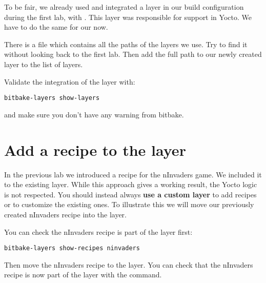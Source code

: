 To be fair, we already used and integrated a layer in our build configuration
during the first lab, with 
{} {}. This layer was responsible for  {}
{ {} {}} support in Yocto. We have to do the same for our
 now.

There is a file which contains all the paths of the layers we use. Try to find it
without looking back to the first lab. Then add the full path to our newly
created layer to the list of layers.

Validate the integration of the  layer with:
\begin{verbatim}
bitbake-layers show-layers
\end{verbatim}

and make sure you don't have any warning from bitbake.

\section{Add a recipe to the layer}

In the previous lab we introduced a recipe for the nInvaders game. We included
it to the existing  layer. While this approach gives a working result,
the Yocto logic is not respected. You should instead always \textbf{use a custom layer}
to add recipes or to customize the existing ones. To illustrate this we will
move our previously created nInvaders recipe into the  layer.

You can check the nInvaders recipe is part of the  layer first:
\begin{verbatim}
bitbake-layers show-recipes ninvaders
\end{verbatim}

Then move the nInvaders recipe to the  layer. You can check that
the nInvaders recipe is now part of the layer with the  command.
